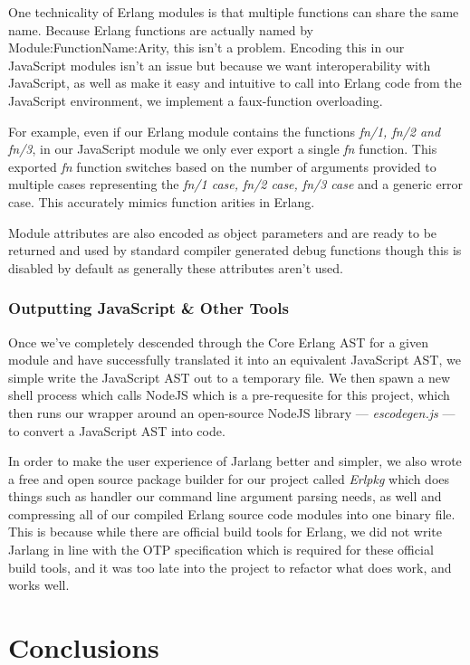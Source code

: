 \documentclass[twoside,12pt,titlepage,a4paper]{article}
\begin{document}
One technicality of Erlang modules is that multiple functions can share the same name. Because Erlang functions are actually named by Module:FunctionName:Arity, this isn't a problem. Encoding this in our JavaScript modules isn't an issue but because we want interoperability with JavaScript, as well as make it easy and intuitive to call into Erlang code from the JavaScript environment, we implement a faux-function overloading.

For example, even if our Erlang module contains the functions \textit{fn/1, fn/2 and fn/3}, in our JavaScript module we only ever export a single \textit{fn} function. This exported \textit{fn} function switches based on the number of arguments provided to multiple cases representing the \textit{fn/1 case, fn/2 case, fn/3 case} and a generic error case. This accurately mimics function arities in Erlang.

Module attributes are also encoded as object parameters and are ready to be returned and used by standard compiler generated debug functions though this is disabled by default as generally these attributes aren't used.

\subsubsection{Outputting JavaScript \& Other Tools}
Once we've completely descended through the Core Erlang AST for a given module and have successfully translated it into an equivalent JavaScript AST, we simple write the JavaScript AST out to a temporary file. We then spawn a new shell process which calls NodeJS which is a pre-requesite for this project, which then runs our wrapper around an open-source NodeJS library --- \textit{escodegen.js} --- to convert a JavaScript AST into code.

In order to make the user experience of Jarlang better and simpler, we also wrote a free and open source package builder for our project called \textit{Erlpkg} which does things such as handler our command line argument parsing needs, as well and compressing all of our compiled Erlang source code modules into one binary file. This is because while there are official build tools for Erlang, we did not write Jarlang in line with the OTP specification which is required for these official build tools, and it was too late into the project to refactor what does work, and works well.

\section{Conclusions}
\label{Conclusions}
\end{document}
